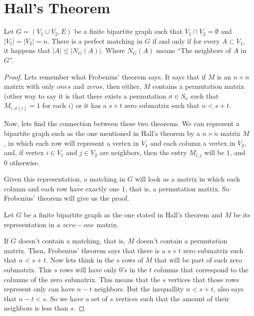 ﻿\chapter{Hall's Theorem}

    \begin{theorem}
        Let $G = (V_1 \cup V_2, E)$ be a finite bipartite graph such that $V_1 \cap V_2 = \emptyset$ and $\left|V_1\right| = \left|V_2\right| = n$.
        There is a perfect matching in $G$ if and only if for every $A \subset V_1$, it happens that $\left|A\right| \leq \left|N_G(A)\right|$. Where
        $N_G(A)$ means ``The neighbors of $A$ in $G$''.
    \end{theorem}
    
    \begin{proof}
        Lets remember what Frobenius' theorem says. It says that if $M$ is an $n \times n$ matrix with only $ones$ and $zeros$, then either,
        $M$ contains a permutation matrix (other way to say it is that there exists a permutation $\sigma \in S_n$ such that $M_{i, \sigma(i)} = 1$ 
        for each $i$) or it has a $s \times t$ zero submatrix such that $n < s + t$.\pn
        
        Now, lets find the connection between these two theorems. We can represent a bipartite graph such as the one mentioned in Hall's theorem by 
        a $n \times n$ matrix $M$, in which each row will represent a vertex in $V_1$ and each column a vertex in $V_2$, and, if vertex $i \in V_1$ and 
        $j \in V_2$ are neighbors, then the entry $M_{i,j}$ will be $1$, and $0$ otherwise.\pn
        
        Given this representation, a matching in $G$ will look as a matrix in which each column and each row have exactly one $1$, that is,
        a permutation matrix. So Frobenius' theorem will give us the proof.\pn
        
        Let $G$ be a finite bipartite graph as the one stated in Hall's theorem and $M$ be its representation in a $zero-one$ matrix.\pn
        
        If $G$ doesn't contain a matching, that is, $M$ doesn't contain a permutation matrix. Then, Frobenius' theorem says that there is 
        a $s \times t$ zero submatrix such that $n < s + t$. Now lets think in the $s$ rows of $M$ that will be part of such zero submatrix.
        This $s$ rows will have only $0$'s in the $t$ columns that correspond to the columns of the zero submatrix. This means that the $s$ vertices that
        those rows represent only can have $n - t$ neighbors. But the inequallity $n < s + t$, also says that $n - t < s$. So we have a
        set of $s$ vertices such that the amount of their neighbors is less than $s$.\pn
        

\end{proof}
